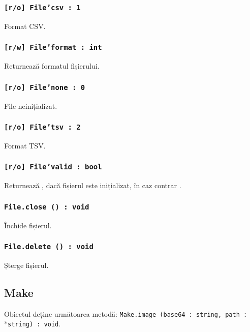 \subsubsection{\texttt{[r/o] File'csv : 1}}

Format CSV.

\subsubsection{\texttt{[r/w] File'format : int}}

Returnează formatul fișierului.

\subsubsection{\texttt{[r/o] File'none : 0}}

File neinițializat.

\subsubsection{\texttt{[r/o] File'tsv : 2}}

Format TSV.

\subsubsection{\texttt{[r/o] File'valid : bool}}

Returnează \true, dacă fișierul este inițializat, în caz contrar \false.

\subsubsection{\texttt{File.close () : void}}

Închide fișierul.

\subsubsection{\texttt{File.delete () : void}}

Șterge fișierul.

\subsection{{\color{orange} Make}}

Obiectul \make{} deține următoarea metodă: \texttt{Make.image (base64 : string, path :}\\*\texttt{string) : void}.

